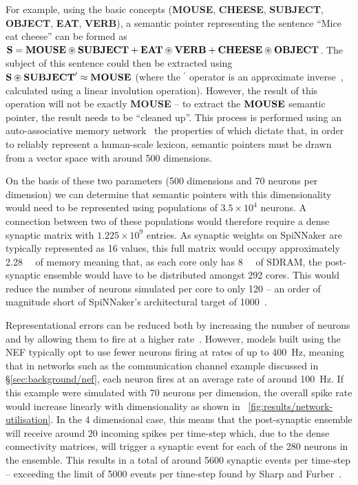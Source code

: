 \documentclass[conference]{IEEEtran}
\newcommand{\semanticpointer}{\textbf}
\newcommand{\msemanticpointer}[1]{\mbox{\semanticpointer{#1}}}
\begin{document}
For example, using the basic concepts (\semanticpointer{MOUSE}, \semanticpointer{CHEESE}, \semanticpointer{SUBJECT}, \semanticpointer{OBJECT}, \semanticpointer{EAT}, \semanticpointer{VERB}), a semantic pointer representing the sentence ``Mice eat cheese'' can be formed as $\msemanticpointer{S} = \msemanticpointer{MOUSE} \circledast \msemanticpointer{SUBJECT} + \msemanticpointer{EAT} \circledast \msemanticpointer{VERB} + \msemanticpointer{CHEESE} \circledast \msemanticpointer{OBJECT}$.
The subject of this sentence could then be extracted using $\msemanticpointer{S} \circledast \msemanticpointer{SUBJECT}^\prime \approx \msemanticpointer{MOUSE}$ (where the ${}^\prime$ operator is an approximate inverse~\parencite[\S D.2]{eliasmith2013build}, calculated using a linear involution operation).
However, the result of this operation will not  be exactly \semanticpointer{MOUSE} -- to extract the $\msemanticpointer{MOUSE}$ semantic pointer, the result needs to be ``cleaned up''.
This process is performed using an auto-associative memory network~\parencite{Stewart2011} the properties of which dictate that, in order to reliably represent a human-scale lexicon, semantic pointers must be drawn from a vector space with around 500 dimensions.

On the basis of these two parameters (500 dimensions and 70 neurons per dimension) we can determine that semantic pointers with this dimensionality would need to be represented using populations of $3.5\times10^4$ neurons.
A connection between two of these populations would therefore require a dense synaptic matrix with $1.225\times10^9$ entries.
As synaptic weights on SpiNNaker are typically represented as \SI{16}{\bit} values, this full matrix would occupy approximately \SI{2.28}{\gibi\byte} of memory meaning that, as each core only has \SI{8}{\mebi\byte} of SDRAM, the post-synaptic ensemble would have to be distributed amongst 292 cores.
This would reduce the number of neurons simulated per core to only 120 -- an order of magnitude short of SpiNNaker's architectural target of 1000~\parencite{Furber2007}.

Representational errors can be reduced both by increasing the number of neurons and by allowing them to fire at a higher rate~\parencite{Eliasmith2004}.
However, models built using the NEF typically opt to use fewer neurons firing at rates of up to \SI{400}{\hertz}, meaning that in networks such as the communication channel example discussed in \S\ref{sec:background/nef}, each neuron fires at an average rate of around \SI{100}{\hertz}.
If this example were simulated with 70 neurons per dimension, the overall spike rate would increase linearly with dimensionality as shown in \figurename~\ref{fig:results/network-utilisation}.
In the 4 dimensional case, this means that the post-synaptic ensemble will receive around 20 incoming spikes per time-step which, due to the dense connectivity matrices, will trigger a synaptic event for each of the 280 neurons in the ensemble. 
This results in a total of around 5600 synaptic events per time-step -- exceeding the limit of 5000 events per time-step found by Sharp and Furber~\parencite{Sharp2013}.
\end{document}

